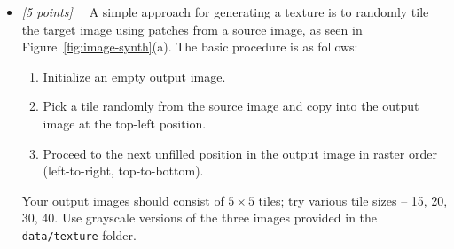 \documentclass[10pt,letterpaper]{article}
\newcommand{\cmd}[1] {{\color{blue}\texttt{#1}}}
\newcommand{\points}[1]{{\color{mygreen}\emph{[#1]\ \ }}}
\begin{document}
\begin{itemize}
\item \points{5 points}  A simple approach for generating a texture is
  to randomly tile the target image using patches from a source
  image, as seen in Figure~\ref{fig:image-synth}(a). The basic
  procedure is as follows:

\begin{enumerate}
   \item Initialize an empty output image.
   \item Pick a tile randomly from the source image and copy into the
     output image at the top-left position.
   \item Proceed to the next unfilled position in the output image in
     raster order (left-to-right, top-to-bottom).
\end{enumerate}

Your output images should consist of $5 \times 5$ tiles; try various
tile sizes -- 15, 20, 30, 40. 
Use grayscale versions of the three images provided in the
\cmd{data/texture} folder.
 


\end{itemize}
\end{document}
